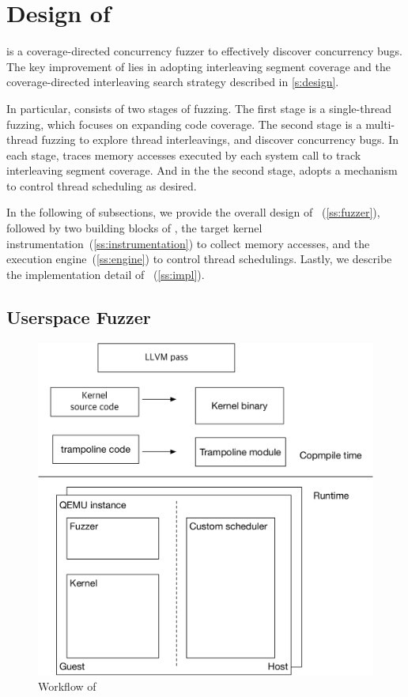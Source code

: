 \section{Design of \sys}
\label{s:impl}

\sys is a coverage-directed concurrency fuzzer to effectively discover
concurrency bugs.
%
The key improvement of \sys lies in adopting interleaving segment
coverage and the coverage-directed interleaving search strategy
described in \autoref{s:design}.
%

In particular, \sys consists of two stages of fuzzing.
%
The first stage is a single-thread fuzzing, which focuses on expanding
code coverage.\dr{}
%
The second stage is a multi-thread fuzzing to explore thread
interleavings, and discover concurrency bugs.
%
In each stage, \sys traces memory accesses executed by each system
call to track interleaving segment coverage.
%
And in the the second stage, \sys adopts a mechanism to control thread
scheduling as desired.



In the following of subsections, we provide the overall design of
\sys~(\autoref{ss:fuzzer}), followed by two building blocks of \sys,
the target kernel instrumentation~(\autoref{ss:instrumentation}) to
collect memory accesses, and the execution
engine~(\autoref{ss:engine}) to control thread schedulings.
%
Lastly, we describe the implementation detail of
\sys~(\autoref{ss:impl}).




\subsection{Userspace Fuzzer}
\label{ss:fuzzer}



\begin{figure}
  \centering
  \includegraphics[width=0.9\linewidth]{fig/architecture.pdf}
  \caption{Workflow of \sys {}}
  \label{fig:workflow}
\end{figure}


